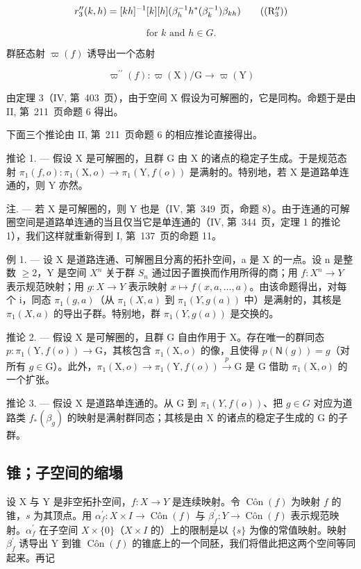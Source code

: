 \[
r _ {3} ^ {\prime \prime} (k, h) = [ k h ] ^ {- 1} [ k ] [ h ] (\beta_ {h} ^ {- 1} h ^ {*} (\beta_ {k} ^ {- 1}) \beta_ {k h})\tag{\((\mathrm{R}_{3}^{\prime \prime})\)}
\]

\[
\text {for } k \text { and } h \in G.
\]

群胚态射 \(\varpi(f)\) 诱导出一个态射

\[
\varpi^ {\prime \prime} (f) \colon \varpi (\mathrm{X}) / \mathrm{G} \to \varpi (\mathrm{Y})
\]

由定理 3（IV, 第~403~页），由于空间 X 假设为可解圈的，它是同构。命题于是由 II, 第~211~页命题 6 得出。

下面三个推论由 II, 第~211~页命题 6 的相应推论直接得出。

推论 1. --- 假设 X 是可解圈的，且群 G 由 X 的诸点的稳定子生成。于是规范态射 \(\pi_{1}(f,o)\colon\pi_{1}(\mathrm{X},o)\to\pi_{1}(\mathrm{Y},f(o))\) 是满射的。特别地，若 X 是道路单连通的，则 Y 亦然。

注. --- 若 X 是可解圈的，则 Y 也是（IV, 第~349~页，命题 8）。由于连通的可解圈空间是道路单连通的当且仅当它是单连通的（IV, 第~344~页，定理 1 的推论 1），我们这样就重新得到 I, 第~137~页的命题 11。

例 1. --- 设 X 是道路连通、可解圈且分离的拓扑空间，a 是 X 的一点。设 n 是整数 \(\geqslant 2\)，Y 是空间 \(X^{n}\) 关于群 \(S_{n}\) 通过因子置换而作用所得的商；用 \(f: X^{n} \to Y\) 表示规范映射；用 \(g: X \to Y\) 表示映射 \(x \mapsto f(x, a, \ldots, a)\)。由该命题得出，对每个 i，同态 \(\pi_{1}(g, a)\)（从 \(\pi_{1}(X, a)\) 到 \(\pi_{1}(Y, g(a))\) 中）是满射的，其核是 \(\pi_{1}(X, a)\) 的导出子群。特别地，群 \(\pi_{1}(Y, g(a))\) 是交换的。

推论 2. --- 假设 X 是可解圈的，且群 G 自由作用于 X。存在唯一的群同态 \(p \colon \pi_1(\mathrm{Y}, f(o)) \to \mathrm{G}\)，其核包含 \(\pi_1(\mathrm{X}, o)\) 的像，且使得 \(p(\mathsf{N}(g)) = g\)（对所有 \(g \in \mathrm{G}\)）。此外，\(\pi_1(\mathrm{X}, o) \to \pi_1(\mathrm{Y}, f(o)) \xrightarrow{p} \mathrm{G}\) 是 G 借助 \(\pi_1(\mathrm{X}, o)\) 的一个扩张。

推论 3. --- 假设 X 是道路单连通的。从 G 到 \(\pi_1(Y, f(o))\)、把 \(g \in G\) 对应为道路类 \(f_*(\beta_g)\) 的映射是满射群同态；其核是由 X 的诸点的稳定子生成的 G 的子群。

\subsection{锥；子空间的缩塌}

设 X 与 Y 是非空拓扑空间，\(f: X \to Y\) 是连续映射。令 \(\operatorname{Côn}(f)\) 为映射 \(f\) 的锥，\(s\) 为其顶点。用 \(\alpha_{f}^{\prime}: X \times I \to \operatorname{Côn}(f)\) 与 \(\beta_{f}^{\prime}: Y \to \operatorname{Côn}(f)\) 表示规范映射。\(\alpha_{f}^{\prime}\) 在子空间 \(X \times \{0\}\)（\(X \times I\) 的）上的限制是以 \(\{s\}\) 为像的常值映射。映射 \(\beta_{f}^{\prime}\) 诱导出 Y 到锥 \(\operatorname{Côn}(f)\) 的锥底上的一个同胚，我们将借此把这两个空间等同起来。再记

